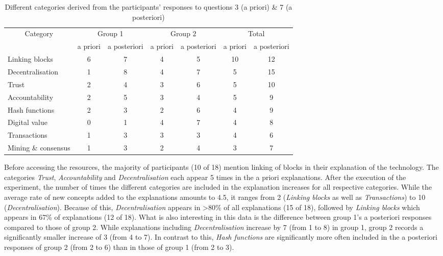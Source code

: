 \begin{table}[]
    \centering
    \begin{tabular}{l|cc|cc|cc}
    \multicolumn{1}{c}{Category}      & \multicolumn{2}{c}{Group 1} & \multicolumn{2}{c}{Group 2} & \multicolumn{2}{c}{Total} \\
          & a priori   & a posteriori  & a priori   & a posteriori   & a priori  & a posteriori  \\
        \hline
Linking blocks      &   6       &        7       &     4       &      5          &    10      &       12      \\
Decentralisation    &   1       &        8       &     4       &       7         &     5      &      15       \\
Trust               &   2       &        4       &     3      &       6         &     5       &      10        \\
Accountability      &   2       &        5       &     3       &       4         &     5      &      9        \\
Hash functions      &   2       &        3        &     2       &   6         &     4         &      9       \\
Digital value       &   0       &        1       &      4      &         7       &     4      &      8        \\
Transactions        &   1       &        3       &     3       &     3        &     4         &       6      \\
Mining \& consensus &   1       &        3       &      2      &       4       &     3        &      7        \\
\end{tabular}
    \caption{Different categories derived from the participants' responses to questions 3 (a priori) \& 7 (a posteriori)}
    \label{tab:responses3+7}
\end{table}


Before accessing the resources, the majority of participants (10 of 18) mention linking of blocks in their explanation of the technology. The categories \textit{Trust}, \textit{Accountability} and \textit{Decentralisation} each appear 5 times in the a priori explanations. After the execution of the experiment, the number of times the different categories are included in the explanation increases for all respective categories. While the average rate of new concepts added to the explanations amounts to 4.5, it ranges from 2 (\textit{Linking blocks} as well as \textit{Transactions}) to 10 (\textit{Decentralisation}). Because of this, \textit{Decentralisation} appears in >80\% of all explanations (15 of 18), followed by \textit{Linking blocks} which appears in 67\% of explanations (12 of 18).
What is also interesting in this data is the difference between group 1's a posteriori responses compared to those of group 2. While explanations including \textit{Decentralisation} increase by 7 (from 1 to 8) in group 1, group 2 records a significantly smaller increase of 3 (from 4 to 7). In contrast to this, \textit{Hash functions} are significantly more often included in the a posteriori responses of group 2 (from 2 to 6) than in those of group 1 (from 2 to 3). 

